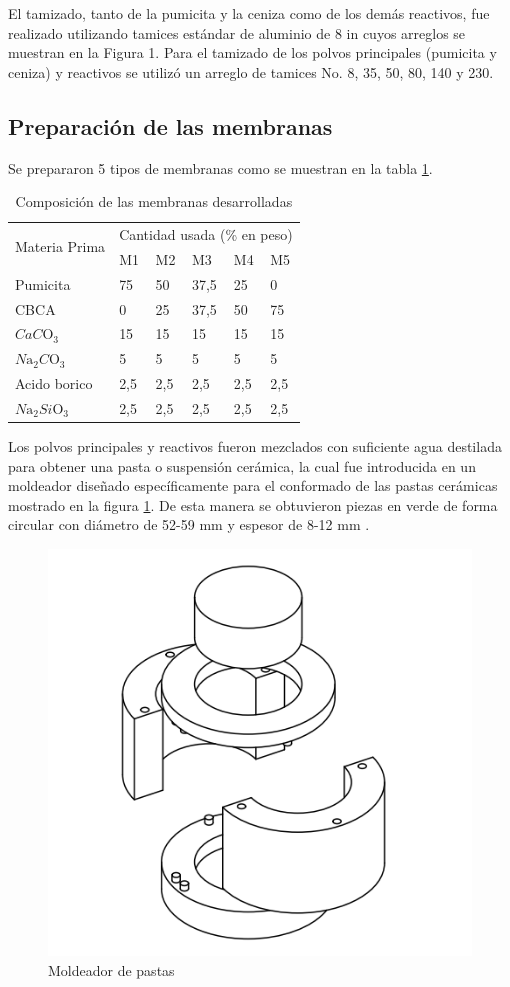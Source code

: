 \documentclass{article}
\begin{document}
El tamizado, tanto de la pumicita y la ceniza como de los demás reactivos, fue realizado utilizando tamices estándar de aluminio de 8 in cuyos arreglos se muestran en la Figura 1. Para el tamizado de los polvos principales (pumicita y ceniza) y reactivos se utilizó un arreglo de tamices No. 8, 35, 50, 80, 140 y 230. 

\subsection{Preparación de las membranas}

Se prepararon 5 tipos de membranas como se muestran en la tabla \ref{tab:Composicion Membranas}. 

\begin{table}[ht]
\caption{Composición de las membranas desarrolladas}
    \centering
    \begin{tabular}{p{3cm} p{2cm} p{2cm} p{2cm} p{2cm} p{2cm}}
         \toprule
        \multirow{2}{*}{Materia Prima} & \multicolumn{5}{c}{Cantidad usada (\% en peso)} \\
        \cline {2-6} 
        & M1 & M2 & M3 & M4 & M5 \\  
         \midrule
        Pumicita & 75 & 50 & 37,5 & 25 & 0 \\
        CBCA     &  0 & 25 & 37,5 & 50 & 75 \\
        $CaC\mathrm{O}_3$ & 15 & 15 & 15 & 15 & 15 \\
        $N\mathrm{a}_2C\mathrm{O}_3$ & 5 & 5 & 5 & 5 & 5 \\
        Acido borico     &  2,5 & 2,5 & 2,5 & 2,5 & 2,5 \\
        $N\mathrm{a}_2Si\mathrm{O}_3$ & 2,5 & 2,5 & 2,5 & 2,5 & 2,5 \\
         \bottomrule
    \end{tabular}
    \label{tab:Composicion Membranas}
\end{table}

Los polvos principales y reactivos fueron mezclados con suficiente agua destilada para obtener una pasta o suspensión cerámica, la cual fue introducida en un moldeador diseñado específicamente para el conformado de las pastas cerámicas mostrado en la figura \ref{fig:Moldeador_Pastas}. De esta manera se obtuvieron piezas en verde de forma circular con diámetro de 52-59 mm y espesor de 8-12 mm . 

\begin{figure}[ht]
    \centering
    \includegraphics[width=0.4\linewidth]{Graphics/Moldeador ZTMY-01.png}
    \caption{Moldeador de pastas}
    \label{fig:Moldeador_Pastas}
\end{figure}
\end{document}
